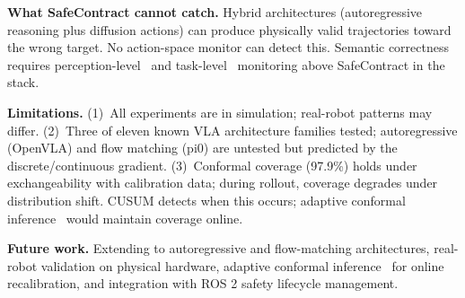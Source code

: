 \documentclass[conference]{IEEEtran}
\begin{document}
\textbf{What SafeContract cannot catch.}
Hybrid architectures (autoregressive reasoning plus diffusion actions) can produce physically valid trajectories toward the wrong target.
No action-space monitor can detect this.
Semantic correctness requires perception-level~\cite{fiper2025} and task-level~\cite{sentinel} monitoring above SafeContract in the stack.

\textbf{Limitations.}
(1)~All experiments are in simulation; real-robot patterns may differ.
(2)~Three of eleven known VLA architecture families tested; autoregressive (OpenVLA) and flow matching (pi0) are untested but predicted by the discrete/continuous gradient.
(3)~Conformal coverage (97.9\%) holds under exchangeability with calibration data; during rollout, coverage degrades under distribution shift. CUSUM detects when this occurs; adaptive conformal inference~\cite{gibbs2021} would maintain coverage online.

\textbf{Future work.}
Extending to autoregressive and flow-matching architectures,
real-robot validation on physical hardware,
adaptive conformal inference~\cite{gibbs2021} for online recalibration,
and integration with ROS 2 safety lifecycle management.
\end{document}
